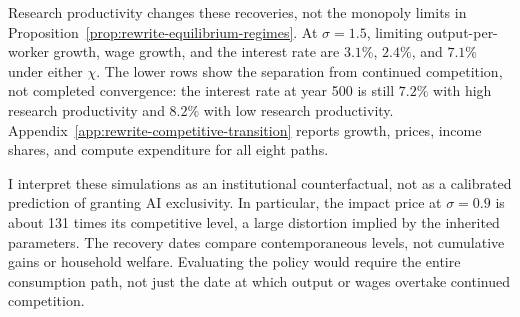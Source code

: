 Research productivity changes these recoveries, not the monopoly limits
in Proposition~\ref{prop:rewrite-equilibrium-regimes}. At $\sigma=1.5$,
limiting output-per-worker growth, wage growth, and the interest rate
are $3.1\%$, $2.4\%$, and $7.1\%$ under either $\chi$. The lower rows
show the separation from continued competition, not completed
convergence: the interest rate at year 500 is still $7.2\%$ with high
research productivity and $8.2\%$ with low research productivity.
Appendix~\ref{app:rewrite-competitive-transition} reports growth,
prices, income shares, and compute expenditure for all eight paths.

I interpret these simulations as an institutional counterfactual, not
as a calibrated prediction of granting AI exclusivity. In particular,
the impact price at $\sigma=0.9$ is about 131 times its competitive
level, a large distortion implied by the inherited parameters.
The recovery dates compare contemporaneous levels, not cumulative
gains or household welfare. Evaluating the policy would require the
entire consumption path, not just the date at which output or wages
overtake continued competition.
